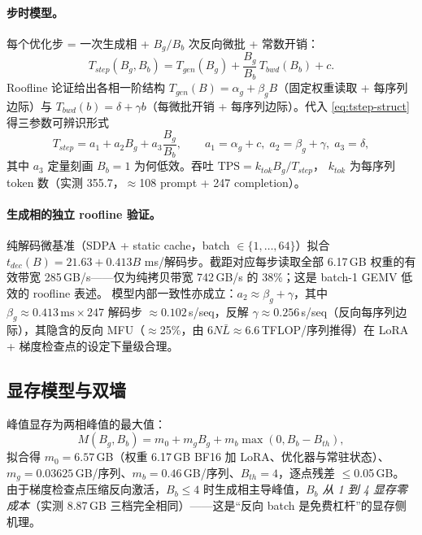 \documentclass[11pt]{article}
\theoremstyle{definition}
\begin{document}
\paragraph{步时模型。}每个优化步 = 一次生成相 + $B_g/B_b$ 次反向微批 + 常数开销：
\begin{equation}\label{eq:tstep-struct}
T_{step}(B_g,B_b) = T_{gen}(B_g) + \frac{B_g}{B_b}\,T_{bwd}(B_b) + c .
\end{equation}
Roofline 论证给出各相一阶结构 $T_{gen}(B)=\alpha_g+\beta_g B$（固定权重读取 + 每序列
边际）与 $T_{bwd}(b)=\delta+\gamma b$（每微批开销 + 每序列边际）。代入
\eqref{eq:tstep-struct} 得三参数可辨识形式
\begin{equation}\label{eq:tstep}
T_{step} = a_1 + a_2 B_g + a_3\frac{B_g}{B_b}, \qquad
a_1=\alpha_g+c,\; a_2=\beta_g+\gamma,\; a_3=\delta,
\end{equation}
其中 $a_3$ 定量刻画 $B_b{=}1$ 为何低效。吞吐 $\mathrm{TPS}=k_{tok}B_g/T_{step}$，
$k_{tok}$ 为每序列 token 数（实测 355.7，$\approx$108 prompt + 247 completion）。

\paragraph{生成相的独立 roofline 验证。}\label{sec:l1-roofline}
纯解码微基准（SDPA + static cache，batch $\in\{1,\dots,64\}$）拟合
$t_{dec}(B)=21.63+0.413B$ ms/解码步。截距对应每步读取全部 6.17\,GB 权重的有效带宽
285\,GB/s——仅为纯拷贝带宽 742\,GB/s 的 38\%；这是 batch-1 GEMV 低效的 roofline 表述。
模型内部一致性亦成立：$a_2\approx\beta_g+\gamma$，其中
$\beta_g\approx0.413\,\text{ms}\times 247$ 解码步 $\approx0.102$\,s/seq，反解
$\gamma\approx0.256$\,s/seq（反向每序列边际），其隐含的反向 MFU（$\approx$25\%，由
$6N\bar L\approx6.6$\,TFLOP/序列推得）在 LoRA + 梯度检查点的设定下量级合理。

\subsection{显存模型与双墙}\label{sec:l1-mem}
峰值显存为两相峰值的最大值：
\begin{equation}\label{eq:mem}
M(B_g,B_b) = m_0 + m_g B_g + m_b\max(0, B_b - B_{th}),
\end{equation}
拟合得 $m_0{=}6.57$\,GB（权重 6.17\,GB BF16 加 LoRA、优化器与常驻状态）、
$m_g{=}0.03625$\,GB/序列、$m_b{=}0.46$\,GB/序列、$B_{th}{=}4$，逐点残差 $\le$0.05\,GB。
由于梯度检查点压缩反向激活，$B_b\le4$ 时生成相主导峰值，\emph{$B_b$ 从 1 到 4 显存零
成本}（实测 8.87\,GB 三档完全相同）——这是“反向 batch 是免费杠杆”的显存侧机理。
\end{document}
